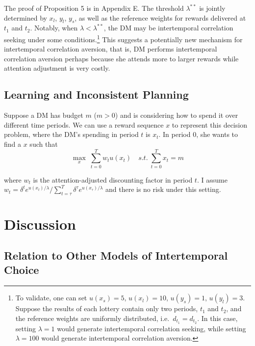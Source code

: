 \documentclass[
  12pt,
]{article}
\begin{document}
The proof of Proposition 5 is in Appendix E. The threshold
\(\lambda^{**}\) is jointly determined by \(x_l\), \(y_l\), \(y_s\), as
well as the reference weights for rewards delivered at \(t_1\) and
\(t_2\). Notably, when \(\lambda < \lambda^{**}\), the DM may be
intertemporal correlation seeking under some conditions.\footnote{To
  validate, one can set \(u(x_s)=5\), \(u(x_l)=10\), \(u(y_s)=1\),
  \(u(y_l)=3\). Suppose the results of each lottery contain only two
  periods, \(t_1\) and \(t_2\), and the reference weights are uniformly
  distributed, i.e.~\(d_{t_1}=d_{t_2}\). In this case, setting
  \(\lambda=1\) would generate intertemporal correlation seeking, while
  setting \(\lambda=100\) would generate intertemporal correlation
  aversion.} This suggests a potentially new mechanism for intertemporal
correlation aversion, that is, DM performs intertemporal correlation
aversion perhaps because she attends more to larger rewards while
attention adjustment is very costly.

\hypertarget{learning-and-inconsistent-planning}{%
\subsection{Learning and Inconsistent
Planning}\label{learning-and-inconsistent-planning}}

Suppose a DM has budget \(m\) (\(m>0\)) and is considering how to spend
it over different time periods. We can use a reward sequence \(x\) to
represent this decision problem, where the DM's spending in period \(t\)
is \(x_t\). In period 0, she wants to find a \(x\) such
that\[ \tag{3} \max_{x}\;\sum_{t=0}^T w_t u(x_t)\quad s.t. \;\sum_{t=0}^T x_t = m   \]

where \(w_t\) is the attention-adjusted discounting factor in period
\(t\). I assume
\(w_t=\delta^t e^{u(x_t)/\lambda}/\sum_{t=\tau}^T \delta^{\tau} e^{u(x_\tau)/\lambda}\)
and there is no risk under this setting.

\hypertarget{discussion}{%
\section{Discussion}\label{discussion}}

\hypertarget{relation-to-other-models-of-intertemporal-choice}{%
\subsection{Relation to Other Models of Intertemporal
Choice}\label{relation-to-other-models-of-intertemporal-choice}}
\end{document}

